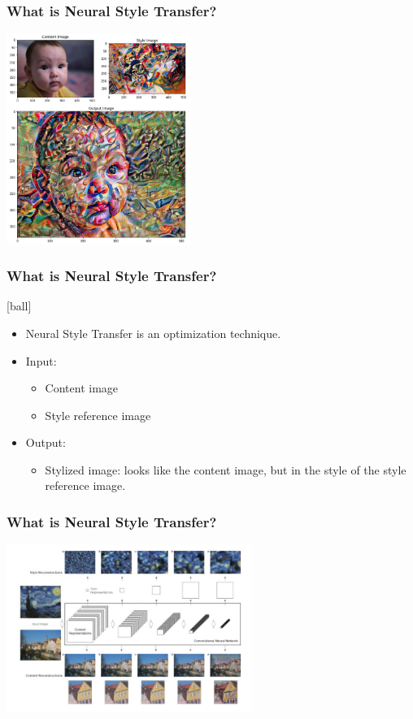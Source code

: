 \documentclass[14pt]{beamer}
\begin{document}
\begin{frame}
    \frametitle{What is Neural Style Transfer?}
    \begin{center}
        \includegraphics[width=60mm]{baby.jpeg}
    \end{center}
\end{frame}

\begin{frame}
		\frametitle{What is Neural Style Transfer?}
		\begin{itemize}
            \item Neural Style Transfer is an optimization technique.
           \item Input:
		\begin{itemize}
		     \item Content image
		     \item Style reference image
		\end{itemize}
             \item Output:
		\begin{itemize}
             \item Stylized image: looks like the content image, but  in the style of the style
        reference image.
        \end{itemize}
        \end{itemize}
\end{frame}

\begin{frame}
    \frametitle{What is Neural Style Transfer?}
    \begin{center}
        \includegraphics[width=80mm]{exp.jpg}
    \end{center}
\end{frame}
\end{document}

